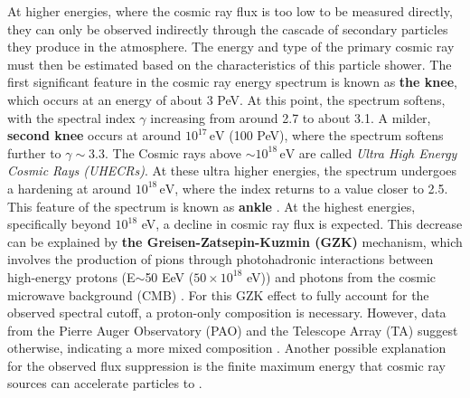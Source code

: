 
At higher energies, where the cosmic ray flux is too low to be measured directly, they can only be observed indirectly through the cascade of secondary particles they produce in the atmosphere. The energy and type of the primary cosmic ray must then be estimated based on the characteristics of this particle shower. The first significant feature in the cosmic ray energy spectrum is known as \textbf{the knee}, which occurs at an energy of about 3 PeV. At this point, the spectrum softens, with the spectral index \( \gamma \) increasing from around 2.7 to about 3.1. A milder, \textbf{second knee} occurs at around \( 10^{17} \, \text{eV} \) (100 PeV), where the spectrum softens further to $\gamma\sim3.3$.  The Cosmic rays above \( \sim10^{18} \, \text{eV} \) are called \emph{Ultra High Energy Cosmic Rays (UHECRs)}. At these ultra higher energies, the spectrum undergoes a hardening at around \( 10^{18} \, \text{eV} \), where the index returns to a value closer to 2.5. This feature of the spectrum is known as \textbf{ankle} . At the highest energies, specifically beyond \(10^{18}\) eV, a decline in cosmic ray flux is expected. This decrease can be explained by \textbf{the Greisen-Zatsepin-Kuzmin (GZK)} mechanism, which involves the production of pions through photohadronic interactions between high-energy protons (E$\sim$50 EeV ($50\times10^{18}$ eV)) and photons from the cosmic microwave background (CMB) . For this GZK effect to fully account for the observed spectral cutoff, a proton-only composition is necessary. However, data from the Pierre Auger Observatory (PAO) and the Telescope Array (TA) suggest otherwise, indicating a more mixed composition . Another possible explanation for the observed flux suppression is the finite maximum energy that cosmic ray sources can accelerate particles to .

